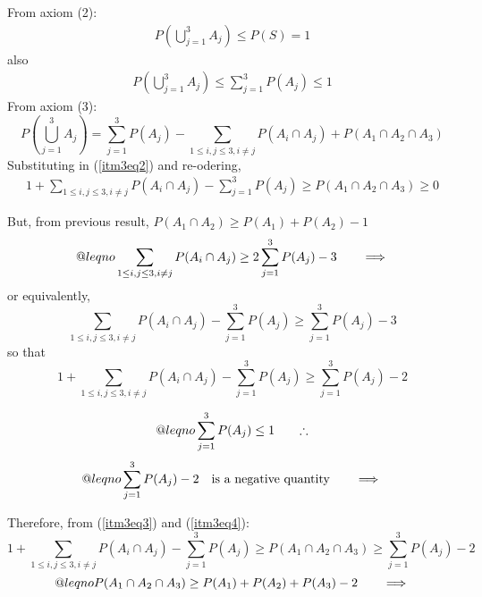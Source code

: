 \documentclass[11pt]{article}
\makeatletter
\newcommand{\LeftEqNo}{\let\veqno\@@leqno}
\makeatother
\begin{document}
\begin{enumerate}[1: ]
	From axiom (2): 
	\begin{align} 
		P(\bigcup_{j=1}^{3} A_j) \le P(S)=1 	\label{itm3eq1}
	\end{align} 
	also
	\begin{align} 
		P(\bigcup_{j=1}^{3} A_j) \le \sum_{j=1}^{3} P(A_j) \le 1 
					\label{itm3eq2}
	\end{align} 
	From axiom (3): 
		\[ P(\bigcup_{j=1}^{3} A_j) = \sum_{j=1}^{3} P(A_j) 
		- \sum_{1\le i,j\le 3,i\ne j}
		P(A_i\cap A_j) + P(A_1\cap A_2 \cap A_3)
		\]
	Substituting in (\ref{itm3eq2}) and re-odering,
	\begin{align} 
	1+\sum_{1\le i,j\le 3,i\ne j} P(A_i\cap A_j) - \sum_{j=1}^{3} P(A_j)
		\ge P(A_1\cap A_2 \cap A_3) \ge 0 	\label{itm3eq3}
	\end{align} 

	But, from previous result, \quad
	$P(A_1\cap A_2) \ge P(A_1) + P(A_2) - 1$
	\begin{equation}\LeftEqNo
	\sum_{1\le i,j\le 3,i\ne j} P(A_i\cap A_j) \ge 2 \sum_{j=1}^{3} P(A_j)-3
		\tag*{$\implies$}
	\end{equation}
	or equivalently,
	\begin{equation*}
	\sum_{1\le i,j\le 3,i\ne j} P(A_i\cap A_j) - \sum_{j=1}^{3}P(A_j) \ge 
		\sum_{j=1}^{3} P(A_j)-3
	\end{equation*}
	so that
	\begin{equation}
	1+\sum_{1\le i,j\le 3,i\ne j} P(A_i\cap A_j) - \sum_{j=1}^{3}P(A_j) \ge 
		\sum_{j=1}^{3} P(A_j)-2 	\label{itm3eq4}
	\end{equation}

	\begin{equation}\LeftEqNo
	\sum_{j=1}^{3} P(A_j) \le 1 \tag*{$\therefore$}
	\end{equation}
	\begin{equation}\LeftEqNo
		\sum_{j=1}^{3} P(A_j) -2  \quad \text{is a negative quantity}
		\tag*{$\implies$}
	\end{equation}

	Therefore, from (\ref{itm3eq3}) and (\ref{itm3eq4}):
	\begin{equation*}
	1+\sum_{1\le i,j\le 3,i\ne j} P(A_i\cap A_j) - \sum_{j=1}^{3}P(A_j) \ge 
		P(A_1\cap A_2\cap A_3) \ge \sum_{j=1}^{3} P(A_j)-2
	\end{equation*}
	\begin{equation}\LeftEqNo
		P(A_1\cap A_2\cap A_3) \ge P(A_1) + P(A_2) + P(A_3) -2
		\tag*{$\implies$}
	\end{equation}


\end{enumerate}
\end{document}
